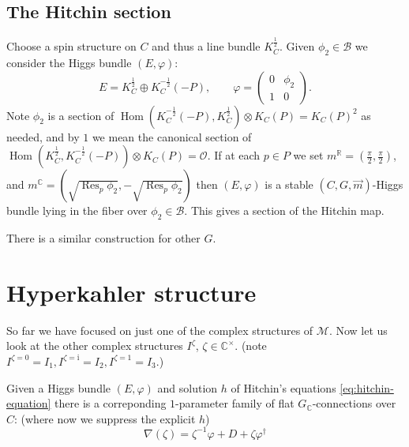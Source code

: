 \documentclass[12pt,letterpaper,reqno]{article}
\numberwithin{equation}{section}
\newcommand{\cB}{\ensuremath{\mathcal B}}
\newcommand{\cM}{\ensuremath{\mathcal M}}
\newcommand{\cO}{\ensuremath{\mathcal O}}
\newcommand{\R}{\ensuremath{\mathbb R}}
\newcommand{\C}{\ensuremath{\mathbb C}}
\newcommand{\half}{\ensuremath{\frac{1}{2}}}
\newcommand{\I}{{\mathrm i}}
\newcommand{\vphi}{{\vec\phi}}
\DeclareMathOperator{\Hom}{Hom}
\DeclareMathOperator{\Res}{Res}
\newcommand{\SU}{\mathrm{SU}}
\newcommand{\fixme}[1]{{\color{orange}{[#1]}}}
\begin{document}
\fixme{write in local coords}

\fixme{remark this is exactly $g$ in abelian case?}


\subsection{The Hitchin section}


\begin{defn}[Hitchin section, for $G = \SU(2)$]
Choose a spin structure on $C$ and thus a line bundle
$K_C^\half$.
Given $\phi_2 \in \cB$ we consider the Higgs bundle
$(E,\varphi)$:
\begin{equation}
  E = K_C^{\half} \oplus K_C^{-\half}(-P), \qquad \varphi = \begin{pmatrix} 0 & \phi_2 \\ 1 & 0 \end{pmatrix}.
\end{equation}
Note $\phi_2$ is a section of $\Hom(K_C^{-\half}(-P), K_C^\half) \otimes K_C(P) = K_C(P)^2$ as needed, and by $1$ we mean the 
canonical section of $\Hom(K_C^\half, K_C^{-\half}(-P)) \otimes K_C(P) = \cO$. If at each $p \in P$ we set
$m^\R = (\frac{\pi}{2},\frac{\pi}{2})$,
and $m^\C = (\sqrt{\Res_p \phi_2}, -\sqrt{\Res_p \phi_2})$
then $(E,\varphi)$ is a stable \fixme{check} 
$(C,G,\vec{m})$-Higgs bundle
lying in the fiber over $\phi_2 \in \cB$.
This gives a section of the Hitchin map.
\end{defn}
There is a similar construction for other $G$. \fixme{give refs}



\section{Hyperkahler structure}

So far we have focused on just one of the complex
structures of $\cM$. Now let us look at the other
complex structures $I^\zeta$, $\zeta \in \C^\times$.
(note $I^{\zeta=0} = I_1, I^{\zeta = \I} = I_2, I^{\zeta = 1} = I_3$.)

Given a Higgs bundle $(E,\varphi)$ and 
solution $h$ of Hitchin's equations \eqref{eq:hitchin-equation}
there is a correponding $1$-parameter family of flat
$G_\C$-connections over $C$:
(where now we suppress the explicit $h$)
\begin{equation}
  \nabla(\zeta) = \zeta^{-1} \varphi + D + \zeta \varphi^\dagger
\end{equation}
\end{document}
